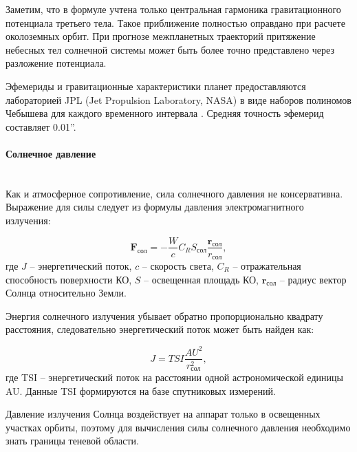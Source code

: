 Заметим, что в формуле учтена только центральная гармоника гравитационного потенциала третьего тела.
Такое приближение полностью оправдано при расчете околоземных орбит.
При прогнозе межпланетных траекторий притяжение небесных тел солнечной системы может быть 
более точно представлено через разложение потенциала.

Эфемериды и гравитационные характеристики планет предоставляются лабораторией JPL 
(Jet Propulsion Laboratory, NASA) в виде наборов полиномов Чебышева для
каждого временного интервала \cite{standish1998}. Средняя точность эфемерид составляет 0.01''.

\paragraph{Солнечное давление} \mbox{} \\

Как и атмосферное сопротивление, сила солнечного давления не консервативна. Выражение для силы следует из формулы давления
электромагнитного излучения:

\begin{equation*}
    \mathbf{F}_{\text{сол}} = -\frac{W}{c} C_R S_{\text{сол}} \frac{\mathbf{r}_{\text{сол}}}{r_{\text{сол}}},
\end{equation*}
где $J$ -- энергетический поток, $c$ -- скорость света,
$C_R$ -- отражательная способность поверхности КО,
$S$ -- освещенная площадь КО,
$\mathbf{r}_{\text{сол}}$ -- радиус вектор Солнца относительно Земли.

Энергия солнечного излучения убывает обратно пропорционально квадрату расстояния, следовательно
энергетический поток может быть найден как:

\begin{equation*}
    J = TSI \frac{AU^2}{r^2_{\text{сол}}},
\end{equation*}
где TSI -- энергетический поток на расстоянии одной астрономической единицы AU.
Данные TSI формируются на базе спутниковых измерений.

Давление излучения Солнца воздействует на аппарат только в освещенных участках орбиты,
поэтому для вычисления силы солнечного давления необходимо знать границы теневой области.

